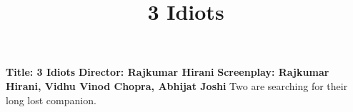\documentclass[10.5pt, a4paper]{article}
\title{3 Idiots}
\begin{document}
\maketitle
\textbf{Title: 3 Idiots}
\textbf{Director: Rajkumar Hirani}
\textbf{Screenplay: Rajkumar Hirani, Vidhu Vinod Chopra, Abhijat Joshi}
Two  are searching for their long lost companion.
\end{document}
